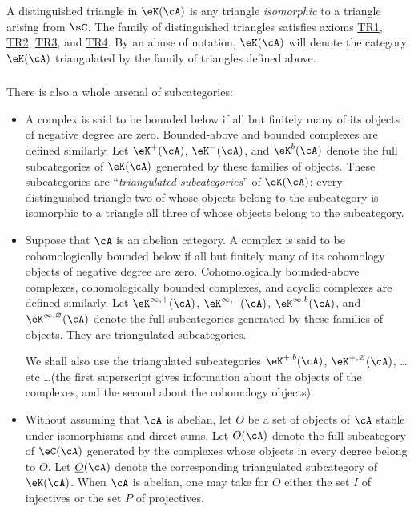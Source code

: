 A distinguished triangle in $\eK(\cA)$ is any triangle \emph{isomorphic}
to a triangle arising from $\sC$. The family of distinguished triangles
satisfies axioms \hyperlink{VIII:TR1}{TR1},
\hyperlink{VIII:TR2}{TR2}, \hyperlink{VIII:TR3}{TR3}, and
\hyperlink{VIII:TR4}{TR4}. By an abuse of notation, $\eK(\cA)$ will denote
the category $\eK(\cA)$ triangulated by the family of triangles defined
above.

\subsubsection{}\label{VIII:1-2-3}

There is also a whole arsenal of subcategories:
\begin{itemize}
  \item A complex is said to be bounded below if all but finitely many of
    its objects of negative degree are zero. Bounded-above and bounded
    complexes are defined similarly. Let $\eK^+(\cA)$, $\eK^-(\cA)$,
    and $\eK^b(\cA)$ denote the full subcategories of $\eK(\cA)$ generated
    by these families of objects. These subcategories are
    “\emph{triangulated subcategories}” of $\eK(\cA)$: every distinguished
    triangle two of whose objects belong to the subcategory is isomorphic
    to a triangle all three of whose objects belong to the subcategory.
  \item Suppose that $\cA$ is an abelian category. A complex is said to be
    cohomologically bounded below if all but finitely many of its
    cohomology objects of negative degree are zero. Cohomologically
    bounded-above complexes, cohomologically bounded complexes, and
    acyclic complexes are defined similarly. Let
    $\eK^{\infty,+}(\cA)$, $\eK^{\infty,-}(\cA)$,
    $\eK^{\infty,b}(\cA)$, and $\eK^{\infty,\varnothing}(\cA)$ denote the
    full subcategories generated by these families of objects. They are
    triangulated subcategories.

    We shall also use the triangulated subcategories $\eK^{+,b}(\cA)$,
    $\eK^{+,\varnothing}(\cA)$, \ldots etc \ldots (the first superscript
    gives information about the objects of the complexes, and the second
    about the cohomology objects).
  \item Without assuming that $\cA$ is abelian, let $O$ be a set of objects
    of $\cA$ stable under isomorphisms and direct sums. Let $O(\cA)$ denote
    the full subcategory of $\eC(\cA)$ generated by the complexes whose
    objects in every degree belong to $O$. Let $\underline O(\cA)$ denote
    the corresponding triangulated subcategory of $\eK(\cA)$. When $\cA$
    is abelian, one may take for $O$ either the set $I$ of injectives or
    the set $P$ of projectives.
\end{itemize}

